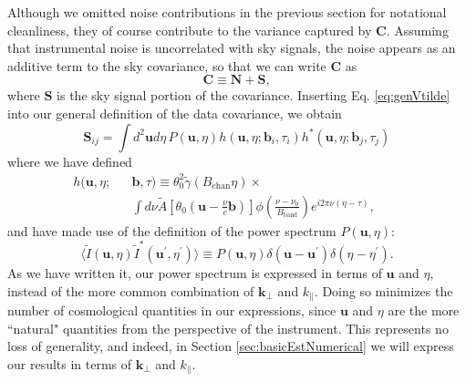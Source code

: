 \documentclass[twocolumn,aps,prd,nofootinbib,showpacs]{revtex4-1}
\begin{document}
Although we omitted noise contributions in the previous section for notational cleanliness, they of course contribute to the variance captured by $\mathbf{C}$.  Assuming that instrumental noise is uncorrelated with sky signals, the noise appears as an additive term to the sky covariance, so that we can write $\mathbf{C}$ as
\begin{equation}
\mathbf{C} \equiv \mathbf{N} + \mathbf{S},
\end{equation}
where $\mathbf{S}$ is the sky signal portion of the covariance.  Inserting  Eq. \eqref{eq:genVtilde} into our general definition of the data covariance, we obtain
\begin{equation}
\label{eq:genCovar}
\mathbf{S}_{ij} =\int d^2 \mathbf{u} d\eta \, P (\mathbf{u}, \eta) h(\mathbf{u} , \eta; \mathbf{b}_i, \tau_i) h^*(\mathbf{u} , \eta; \mathbf{b}_j, \tau_j)
\end{equation}
where we have defined
\begin{eqnarray}
\label{eq:hDef}
h(\mathbf{u}, \eta; &&\mathbf{b}, \tau)  \equiv \theta_0^2 \widetilde{\gamma} ( B_\textrm{chan} \eta ) \times \nonumber \\
&& \int d\nu  \widetilde{A} \left[ \theta_0 \left( \mathbf{u} - \frac{\nu}{c} \mathbf{b} \right) \right] \phi \left( \frac{\nu - \nu_0}{B_\textrm{band}} \right) e^{i 2 \pi \nu (\eta - \tau)}, \qquad
\end{eqnarray}
and have made use of the definition of the power spectrum $P (\mathbf{u}, \eta)$:
\begin{equation}
\langle \widetilde{I} (\mathbf{u}, \eta) \widetilde{I}^* (\mathbf{u}^\prime, \eta^\prime) \rangle \equiv P(\mathbf{u}, \eta) \delta(\mathbf{u} - \mathbf{u}^\prime) \delta(\eta - \eta^\prime).
\end{equation}
As we have written it, our power spectrum is expressed in terms of $\mathbf{u}$ and $\eta$, instead of the more common combination of $\mathbf{k}_\perp$ and $k_\parallel$.  Doing so minimizes the number of cosmological quantities in our expressions, since $\mathbf{u}$ and $\eta$ are the more ``natural" quantities from the perspective of the instrument.  This represents no loss of generality, and indeed, in Section \ref{sec:basicEstNumerical} we will express our results in terms of $\mathbf{k}_\perp$ and $k_\parallel$.
\end{document}
